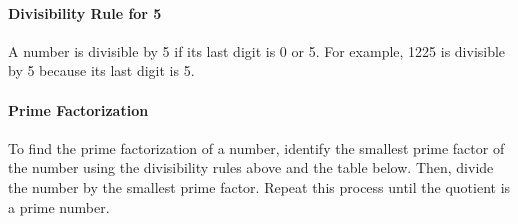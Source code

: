 \documentclass{article}
\begin{document}
\begin{multicols}{2}
\paragraph{Divisibility Rule for 5} A number is divisible by 5 if its last digit is 0 or
  5. For example, 1225 is divisible by 5 because its last digit is 5.

\paragraph{Prime Factorization} To find the prime factorization of a number, identify
  the smallest prime factor of the number using the divisibility rules above and the table
  below. Then, divide the number by the smallest prime factor. Repeat this process
  until the quotient is a prime number.
\end{multicols}

{\setlength{\tabcolsep}{0.5pt}
\fontsize{5}{8}\selectfont
{}

\begin{multicols}{3}
\raggedcolumns{}
\end{multicols}}
\end{document}
